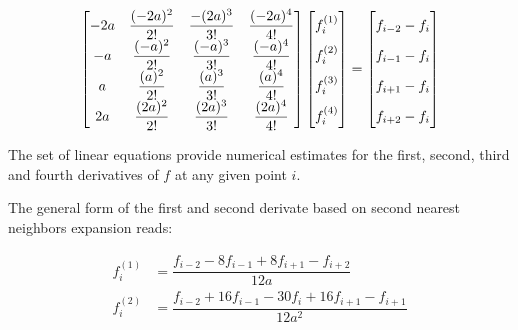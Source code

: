 \begin{align}
\begin{bmatrix}
    -2a & \dfrac{(-2a)^2}{2!} & \dfrac{-(2a)^3}{3!} & \dfrac{(-2a)^4}{4!}\\
    -a & \dfrac{(-a)^2}{2!} & \dfrac{(-a)^3}{3!} & \dfrac{(-a)^4}{4!}\\
    a & \dfrac{(a)^2}{2!} & \dfrac{(a)^3}{3!} & \dfrac{(a)^4}{4!}\\
    2a & \dfrac{(2a)^2}{2!} & \dfrac{(2a)^3}{3!} & \dfrac{(2a)^4}{4!}
\end{bmatrix}
\begin{bmatrix}
    f_i^{(1)}  \vphantom{ \dfrac{d^4}{d} }\\
    f_i^{(2)}  \vphantom{ \dfrac{d^4}{d} } \\
    f_i^{(3)}  \vphantom{ \dfrac{d^4}{d} } \\
    f_i^{(4)}  \vphantom{ \dfrac{d^4}{d} }
\end{bmatrix}
=
\begin{bmatrix}
    f_{i-2} - f_{i}    \vphantom{ \dfrac{d^4}{d}} \\
    f_{i-1} - f_{i}    \vphantom{ \dfrac{d^4}{d}} \\
    f_{i+1} - f_{i}    \vphantom{ \dfrac{d^4}{d}} \\
    f_{i+2} - f_{i}    \vphantom{ \dfrac{d^4}{d}}
\end{bmatrix}
\end{align}

The set of linear equations provide numerical estimates for the first, second, third and fourth derivatives of $f$ at any given point $i$.

The general form of the first and second derivate based on second nearest neighbors expansion reads:

\begin{align*}
f^{(1)}_i &= \dfrac{f_{i-2}-8f_{i-1} + 8f_{i+1} - f_{i+2}}{12a} \\
f^{(2)}_i &= \dfrac{f_{i-2}+16f_{i-1} -30f_{i} + 16f_{i+1} - f_{i+1}}{12a^2}
\end{align*}


